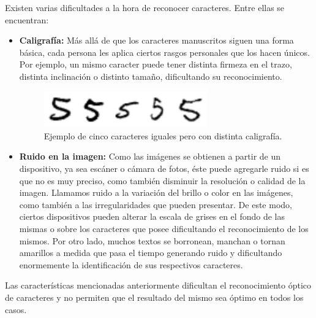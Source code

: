 \documentclass[10pt, a4paper]{article}
\begin{document}
Existen varias dificultades a la hora de reconocer caracteres. Entre ellas se encuentran:
\begin{itemize}
 \item \textbf{Caligrafía:} Más allá de que los caracteres manuscritos siguen una forma básica, cada persona les aplica ciertos rasgos personales que los hacen únicos. Por ejemplo, un mismo caracter puede tener distinta firmeza en el trazo, distinta inclinación o distinto tamaño, dificultando su reconocimiento.

\begin{figure}[H] %
\begin{center}
\includegraphics[width=200pt]{../informe/imgs/ejemplo1_anteproyecto.png}
\caption[h]{Ejemplo de cinco caracteres iguales pero con distinta caligrafía.}
\end{center}
\end{figure}

\item \textbf{Ruido en la imagen:} Como las imágenes se obtienen a partir de un dispositivo, ya sea escáner o cámara de fotos, éste puede agregarle ruido si es que no es muy preciso, como también disminuir la resolución o calidad de la imagen. Llamamos ruido a la variación del brillo o color en las imágenes, como también a las irregularidades que pueden presentar. De este modo, ciertos dispositivos pueden alterar la escala de grises en el fondo de las mismas o sobre los caracteres que posee dificultando el reconocimiento de los mismos. 
Por otro lado, muchos textos se borronean, manchan o tornan amarillos a medida que pasa el tiempo generando ruido y dificultando enormemente la identificación de sus respectivos caracteres.
\end{itemize}

Las características mencionadas anteriormente dificultan el reconocimiento óptico de caracteres y no permiten que el resultado del mismo sea óptimo en todos los casos.
\end{document}
